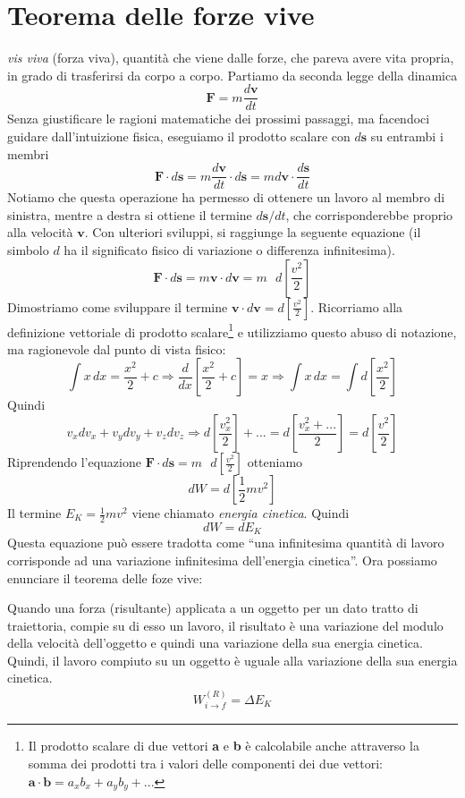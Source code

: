 \section{Teorema delle forze vive}
\textit{vis viva} (forza viva), quantità che viene dalle forze, che pareva avere
vita propria, in grado di trasferirsi da corpo a corpo.
Partiamo da seconda legge della dinamica
\[ \textbf{F} = m\frac{d\textbf{v}}{dt} \]
Senza giustificare le ragioni matematiche dei prossimi passaggi, ma facendoci
guidare dall'intuizione fisica, eseguiamo il prodotto scalare con $d\textbf{s}$
su entrambi i membri
\[ \textbf{F}\cdot d\textbf{s} = m\frac{d\textbf{v}}{dt}\cdot d\textbf{s} = m d\textbf{v}\cdot\frac{d\textbf{s}}{dt} \]
Notiamo che questa operazione ha permesso di ottenere un lavoro al membro di
sinistra, mentre a destra si ottiene il termine $d\mathbf{s}/dt$, che corrisponderebbe
proprio alla velocità $\textbf{v}$. Con ulteriori sviluppi, si raggiunge la
seguente equazione (il simbolo $d$ ha il significato fisico di variazione o
differenza infinitesima).
\[ \textbf{F}\cdot d\textbf{s} = m\textbf{v}\cdot d\textbf{v} = m\text{ }d\left[\frac{v^2}{2}\right] \]
Dimostriamo come sviluppare il termine $\textbf{v}\cdot d\textbf{v} = d\left[\frac{v^2}{2}\right]$.
Ricorriamo alla definizione vettoriale di prodotto scalare\footnote{Il prodotto scalare
di due vettori \textbf{a} e \textbf{b} è calcolabile anche attraverso la somma
dei prodotti tra i valori delle componenti dei due vettori: $\mathbf{a}\cdot\mathbf{b} = a_xb_x + a_yb_y + ...$}
e utilizziamo questo abuso di notazione, ma ragionevole dal punto di vista fisico:
\[ \int x \,dx =  \frac{x^2}{2} + c \Rightarrow \frac{d}{dx}\left[\frac{x^2}{2} + c\right] = x \Rightarrow \int x \,dx = \int d\left[\frac{x^2}{2}\right] \]
Quindi
\[ v_x dv_x + v_y dv_y + v_z dv_z \Rightarrow d\left[\frac{v_x^2}{2}\right] + ... = d\left[\frac{v_x^2 + ...}{2}\right] = d\left[\frac{v^2}{2}\right] \]
Riprendendo l'equazione $\mathbf{F}\cdot d\textbf{s} = m\text{ }d\left[\frac{v^2}{2}\right]$ otteniamo
\[ dW = d\left[\frac12 mv^2\right] \]
Il termine $E_K = \frac{1}{2}mv^2$ viene chiamato \textit{energia cinetica}. Quindi
\[ dW = dE_K \]
Questa equazione può essere tradotta come ``una infinitesima quantità di lavoro
corrisponde ad una variazione infinitesima dell'energia cinetica''. Ora possiamo
enunciare il teorema delle foze vive:
\vspace{8pt}
\begin{tcolorbox}[colback = red!30, colframe = red!30!black, title = {Teorema dell'energia cinetica (o delle forze vive)}]
    Quando una forza (risultante) applicata a un oggetto per un dato tratto di
    traiettoria, compie su di esso un lavoro, il risultato è una variazione del
    modulo della velocità dell'oggetto e quindi una variazione della sua energia
    cinetica. Quindi, il lavoro compiuto su un oggetto è uguale alla variazione
    della sua energia cinetica.
    \begin{align}
        W_{i\to f}^{(R)} = \Delta E_K
    \end{align}
\end{tcolorbox}
\vspace{5pt}

